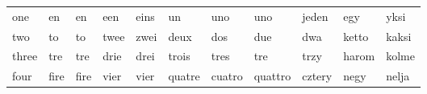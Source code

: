 \documentclass[a4paper, 20pt]{article}
\begin{document}
\begin{table}[h]
{\begin{tabular}{|lllllllllll|}
one                                                  & en                                                    & en                                                   & een                                                     & eins                                                 & un                                                     & uno                                                    & uno                                                    & jeden                                                & egy                                                   & yksi                                                 \\
two                                                  & to                                                    & to                                                   & twee                                                    & zwei                                                 & deux                                                   & dos                                                    & due                                                    & dwa                                                  & ketto                                                 & kaksi                                                \\
three                                                & tre                                                   & tre                                                  & drie                                                    & drei                                                 & trois                                                  & tres                                                   & tre                                                    & trzy                                                 & harom                                                 & kolme                                                \\
four                                                 & fire                                                  & fire                                                 & vier                                                    & vier                                                 & quatre                                                 & cuatro                                                 & quattro                                                & cztery                                               & negy                                                  & nelja                                                \\

\end{tabular}}
\end{table}
\end{document}
